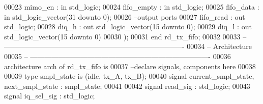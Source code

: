 \begin{DoxyCode}
00023       \textcolor{vhdlchar}{mimo_en}       \textcolor{vhdlchar}{:} \textcolor{keywordflow}{in} \textcolor{comment}{std\_logic};
00024       \textcolor{vhdlchar}{fifo_empty}    \textcolor{vhdlchar}{:} \textcolor{keywordflow}{in} \textcolor{comment}{std\_logic};
00025       \textcolor{vhdlchar}{fifo_data} \textcolor{vhdlchar}{:} \textcolor{keywordflow}{in} \textcolor{comment}{std\_logic\_vector}\textcolor{vhdlchar}{(}\textcolor{vhdllogic}{}\textcolor{vhdllogic}{31} \textcolor{keywordflow}{downto} \textcolor{vhdllogic}{}\textcolor{vhdllogic}{0}\textcolor{vhdlchar}{)};
00026 \textcolor{keyword}{        --output ports }
00027       \textcolor{vhdlchar}{fifo_read} \textcolor{vhdlchar}{:} \textcolor{keywordflow}{out} \textcolor{comment}{std\_logic};
00028       \textcolor{vhdlchar}{diq_h}         \textcolor{vhdlchar}{:} \textcolor{keywordflow}{out} \textcolor{comment}{std\_logic\_vector}\textcolor{vhdlchar}{(}\textcolor{vhdllogic}{}\textcolor{vhdllogic}{15} \textcolor{keywordflow}{downto} \textcolor{vhdllogic}{}\textcolor{vhdllogic}{0}\textcolor{vhdlchar}{)};
00029       \textcolor{vhdlchar}{diq_l}         \textcolor{vhdlchar}{:} \textcolor{keywordflow}{out} \textcolor{comment}{std\_logic\_vector}\textcolor{vhdlchar}{(}\textcolor{vhdllogic}{}\textcolor{vhdllogic}{15} \textcolor{keywordflow}{downto} \textcolor{vhdllogic}{}\textcolor{vhdllogic}{0}\textcolor{vhdlchar}{)}
00030         \textcolor{vhdlchar}{)};
00031 \textcolor{keywordflow}{end} \textcolor{vhdlchar}{rd\_tx\_fifo};
00032 
00033 \textcolor{keyword}{-- ----------------------------------------------------------------------------}
00034 \textcolor{keyword}{-- Architecture}
00035 \textcolor{keyword}{-- ----------------------------------------------------------------------------}
00036 \textcolor{keywordflow}{architecture} arch \textcolor{keywordflow}{of} rd_tx_fifo is
00037 \textcolor{keyword}{--declare signals,  components here}
00038 
00039   \textcolor{keywordflow}{type} \textcolor{vhdlchar}{smpl_state} \textcolor{keywordflow}{is} \textcolor{vhdlchar}{(}\textcolor{vhdlchar}{idle}\textcolor{vhdlchar}{,} \textcolor{vhdlchar}{tx\_A}\textcolor{vhdlchar}{,} \textcolor{vhdlchar}{tx\_B}\textcolor{vhdlchar}{)};
00040   \textcolor{keywordflow}{signal} \textcolor{vhdlchar}{current_smpl_state}\textcolor{vhdlchar}{,} \textcolor{vhdlchar}{next_smpl_state} \textcolor{vhdlchar}{:}  \textcolor{vhdlchar}{smpl_state}; 
00041   
00042   \textcolor{keywordflow}{signal} \textcolor{vhdlchar}{read_sig}   \textcolor{vhdlchar}{:} \textcolor{comment}{std\_logic};
00043   \textcolor{keywordflow}{signal} \textcolor{vhdlchar}{iq_sel_sig} \textcolor{vhdlchar}{:} \textcolor{comment}{std\_logic};

\end{DoxyCode}
